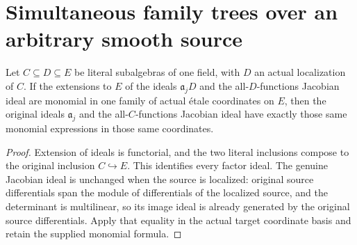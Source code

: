 \section{Simultaneous family trees over an arbitrary smooth source}

\begin{lemma}\label{lem:sc0-family-leaf-source-localization}
\leanok
{}
Let $C\subseteq D\subseteq E$ be literal subalgebras of one field, with $D$
an actual localization of $C$. If the extensions to $E$ of the ideals
$\mathfrak a_jD$ and the all-$D$-functions Jacobian ideal are monomial in one
family of actual \'etale coordinates on $E$, then the original ideals
$\mathfrak a_j$ and the all-$C$-functions Jacobian ideal have exactly those
same monomial expressions in those same coordinates.
\end{lemma}
\begin{proof}
Extension of ideals is functorial, and the two literal inclusions compose to
the original inclusion $C\hookrightarrow E$. This identifies every factor
ideal. The genuine Jacobian ideal is unchanged when the source is localized:
original source differentials span the module of differentials of the
localized source, and the determinant is multilinear, so its image ideal is
already generated by the original source differentials. Apply that equality
in the actual target coordinate basis and retain the supplied monomial formula.
\end{proof}

